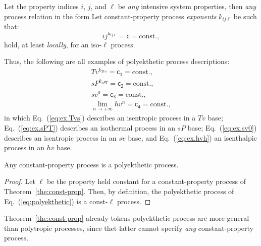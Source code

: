     \begin{definition}\label{def:polyekthetic.exponent}
        Let the property indices $i$, $j$, and $\ell$ be \emph{any} intensive system properties,
        then \emph{any} process relation in the form
        Let constant-property process \emph{exponents} $k_{ij\ell}$ be such that:
        \begin{equation}
            ij^{k_{ij\ell}} = \mathsf{c} = \mbox{const.},
            \label{eq:polyekthetic}
        \end{equation}
        \noindent hold, at least \emph{locally}, for an iso-$\ell$ process.

    Thus, the following are all examples of polyekthetic process descriptions:
    \begin{align}
        Tv^{k_{Tvs}} = \mathsf{c_1} = \mbox{const.}, \label{eq:ex.Tvs} \\
        sP^{k_{sPT}} = \mathsf{c_2} = \mbox{const.}, \label{eq:ex.sPT} \\
        sv^0 = \mathsf{c_3} = \mbox{const.}, \label{eq:ex.sv0} \\
        \lim_{n \to +\infty}hv^n = \mathsf{c_4} = \mbox{const.}, \label{eq:ex.hvh}
    \end{align}
    \noindent in which Eq.~(\ref{eq:ex.Tvs}) describes an isentropic process  in  a  $Tv$  base;
    Eq.~(\ref{eq:ex.sPT}) describes an isothermal process in an $sP$ base; Eq.~(\ref{eq:ex.sv0})
    describes an isentropic process in an $sv$ base, and  Eq.~(\ref{eq:ex.hvh})  an  isenthalpic
    process in an $hv$ base.

    \begin{theorem}\label{the:const-prop}
        Any constant-property process is a polyekthetic process.
    \end{theorem}

    \begin{proof}
        Let  $\ell$  be  the  property  held  constant  for  a  constant-property   process   of
        Theorem~\ref{the:const-prop}.  Then,  by  definition,  the   polyekthetic   process   of
        Eq.~(\ref{eq:polyekthetic}) is a const-$\ell$ process.
    \end{proof}

    Theorem~\ref{the:const-prop} already tokens  polyekthetic  process  are  more  general  than
    polytropic processes, since thet latter cannot specify \emph{any} constant-property process.


\end{definition}
